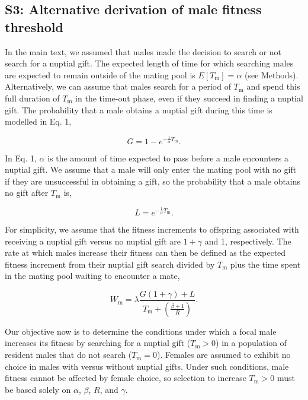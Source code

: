 \documentclass[
]{article}
\begin{document}
\captionsetup{labelformat=default}

\clearpage

\hypertarget{s3-alternative-derivation-of-male-fitness-threshold}{%
\subsection{S3: Alternative derivation of male fitness
threshold}\label{s3-alternative-derivation-of-male-fitness-threshold}}

In the main text, we assumed that males made the decision to search or
not search for a nuptial gift. The expected length of time for which
searching males are expected to remain outside of the mating pool is
\(E[T_{\mathrm{m}}] = \alpha\) (see Methods). Alternatively, we can
assume that males search for a period of \(T_{\mathrm{m}}\) and spend
this full duration of \(T_{\mathrm{m}}\) in the time-out phase, even if
they succeed in finding a nuptial gift. The probability that a male
obtains a nuptial gift during this time is modelled in Eq. 1,

\[G = 1 - e^{-\frac{1}{\alpha}T_{\mathrm{m}}}.\]

In Eq. 1, \(\alpha\) is the amount of time expected to pass before a
male encounters a nuptial gift. We assume that a male will only enter
the mating pool with no gift if they are unsuccessful in obtaining a
gift, so the probability that a male obtains no gift after
\(T_{\mathrm{m}}\) is,

\[L = e^{-\frac{1}{\alpha}T_{\mathrm{m}}}.\]

For simplicity, we assume that the fitness increments to offspring
associated with receiving a nuptial gift versus no nuptial gift are
\(1 + \gamma\) and 1, respectively. The rate at which males increase
their fitness can then be defined as the expected fitness increment from
their nuptial gift search divided by \(T_{\mathrm{m}}\) plus the time
spent in the mating pool waiting to encounter a mate,

\[W_{\mathrm{m}} = \lambda \frac{G\left(1 + \gamma\right) + L}{T_{\mathrm{m}} + \left( \frac{\beta + 1}{R} \right)}.\]

Our objective now is to determine the conditions under which a focal
male increases its fitness by searching for a nuptial gift
(\(T_{\mathrm{m}}>0\)) in a population of resident males that do not
search (\(T_{\mathrm{m}}=0\)). Females are assumed to exhibit no choice
in males with versus without nuptial gifts. Under such conditions, male
fitness cannot be affected by female choice, so selection to increase
\(T_{\mathrm{m}}>0\) must be based solely on \(\alpha\), \(\beta\),
\(R\), and \(\gamma\).
\end{document}
